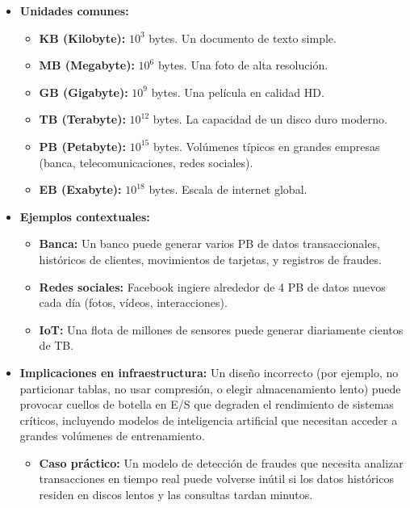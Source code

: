 \documentclass[12pt,a4paper,openany,oneside]{book}
\begin{document}
\begin{itemize}
    \item \textbf{Unidades comunes:}
        \begin{itemize}
            \item \textbf{KB (Kilobyte):} $10^3$ bytes. Un documento de texto simple.
            \item \textbf{MB (Megabyte):} $10^6$ bytes. Una foto de alta resolución.
            \item \textbf{GB (Gigabyte):} $10^9$ bytes. Una película en calidad HD.
            \item \textbf{TB (Terabyte):} $10^{12}$ bytes. La capacidad de un disco duro moderno.
            \item \textbf{PB (Petabyte):} $10^{15}$ bytes. Volúmenes típicos en grandes empresas (banca, telecomunicaciones, redes sociales).
            \item \textbf{EB (Exabyte):} $10^{18}$ bytes. Escala de internet global.
        \end{itemize}
    \item \textbf{Ejemplos contextuales:}
        \begin{itemize}
            \item \textbf{Banca:} Un banco puede generar varios PB de datos transaccionales, históricos de clientes, movimientos de tarjetas, y registros de fraudes.
            \item \textbf{Redes sociales:} Facebook ingiere alrededor de 4 PB de datos nuevos cada día (fotos, vídeos, interacciones).
            \item \textbf{IoT:} Una flota de millones de sensores puede generar diariamente cientos de TB.
        \end{itemize}
    \item \textbf{Implicaciones en infraestructura:} Un diseño incorrecto (por ejemplo, no particionar tablas, no usar compresión, o elegir almacenamiento lento) puede provocar cuellos de botella en E/S que degraden el rendimiento de sistemas críticos, incluyendo modelos de inteligencia artificial que necesitan acceder a grandes volúmenes de entrenamiento.
        \begin{itemize}
            \item \textbf{Caso práctico:} Un modelo de detección de fraudes que necesita analizar transacciones en tiempo real puede volverse inútil si los datos históricos residen en discos lentos y las consultas tardan minutos.
        \end{itemize}
\end{itemize}
\end{document}
